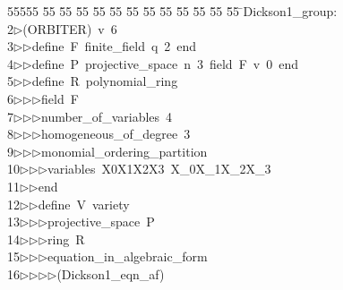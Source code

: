%
%
\begin{tabbing}
55555 \= 55 \= 55 \= 55 \= 55 \= 55 \= 55 \= 55 \= 55 \= 55 \= 55 \= 55 \= 55 \= \>Dickson1\_group:\\[0pt]
2\>$\triangleright$\>(ORBITER)\ v\ 6\ \\[0pt]
3\>$\triangleright$\>$\triangleright$\>define\ F\ finite\_field\ q\ 2\ end\ \\[0pt]
4\>$\triangleright$\>$\triangleright$\>define\ P\ projective\_space\ n\ 3\ field\ F\ v\ 0\ end\ \\[0pt]
5\>$\triangleright$\>$\triangleright$\>define\ R\ polynomial\_ring\ \\[0pt]
6\>$\triangleright$\>$\triangleright$\>$\triangleright$\>field\ F\ \\[0pt]
7\>$\triangleright$\>$\triangleright$\>$\triangleright$\>number\_of\_variables\ 4\ \\[0pt]
8\>$\triangleright$\>$\triangleright$\>$\triangleright$\>homogeneous\_of\_degree\ 3\ \\[0pt]
9\>$\triangleright$\>$\triangleright$\>$\triangleright$\>monomial\_ordering\_partition\ \\[0pt]
10\>$\triangleright$\>$\triangleright$\>$\triangleright$\>variables\ X0X1X2X3\ X\_0X\_1X\_2X\_3\ \\[0pt]
11\>$\triangleright$\>$\triangleright$\>end\ \\[0pt]
12\>$\triangleright$\>$\triangleright$\>define\ V\ variety\ \\[0pt]
13\>$\triangleright$\>$\triangleright$\>$\triangleright$\>projective\_space\ P\ \\[0pt]
14\>$\triangleright$\>$\triangleright$\>$\triangleright$\>ring\ R\ \\[0pt]
15\>$\triangleright$\>$\triangleright$\>$\triangleright$\>equation\_in\_algebraic\_form\ \\[0pt]
16\>$\triangleright$\>$\triangleright$\>$\triangleright$\>$\triangleright$\>(Dickson1\_eqn\_af)\ \\[0pt]

\end{tabbing}
